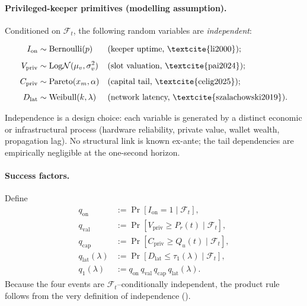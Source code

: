 \documentclass[11pt]{article}
\begin{document}
\paragraph{Privileged-keeper primitives (modelling assumption).}
Conditioned on $\mathcal F_t$, the following random variables are
\emph{independent}:

\[
\begin{aligned}
I_{\mathrm{on}}
   &\sim \mathrm{Bernoulli}(p)
   &&\text{(keeper uptime, \textcite{li2000});}\\[4pt]
V_{\mathrm{priv}}
   &\sim \mathrm{Log\mathcal N}(\mu_v,\sigma_v^2)
   &&\text{(slot valuation, \textcite{pai2024});}\\[4pt]
C_{\mathrm{priv}}
   &\sim \mathrm{Pareto}(x_m,\alpha)
   &&\text{(capital tail, \textcite{celig2025});}\\[4pt]
D_{\mathrm{lat}}
   &\sim \mathrm{Weibull}(k,\lambda)
   &&\text{(network latency, \textcite{szalachowski2019}).}
\end{aligned}
\]

Independence is a design choice:  
each variable is generated by a distinct economic or infrastructural
process (hardware reliability, private value, wallet wealth,
propagation lag).  No structural link is known ex-ante; the tail
dependencies are empirically negligible at the one-second horizon.

\paragraph{Success factors.}
Define
\[
\begin{aligned}
q_{\mathrm{on}}
    &:= \Pr[I_{\mathrm{on}}=1\mid\mathcal F_t],\\
q_{\mathrm{val}}
    &:= \Pr[V_{\mathrm{priv}}\ge P_r(t)\mid\mathcal F_t],\\
q_{\mathrm{cap}}
    &:= \Pr[C_{\mathrm{priv}}\ge Q_u(t)\mid\mathcal F_t],\\
q_{\mathrm{lat}}(\lambda)
    &:= \Pr[D_{\mathrm{lat}}\le\tau_1(\lambda)\mid\mathcal F_t],\\
q_1(\lambda)
    &:= q_{\mathrm{on}}\,
        q_{\mathrm{val}}\,
        q_{\mathrm{cap}}\,
        q_{\mathrm{lat}}(\lambda).
\end{aligned}
\]
Because the four events are $\mathcal F_t$–conditionally independent,
the product rule follows from the very
definition of independence (\textcite[Def.\ 9.1]{williams1991}).
\end{document}
